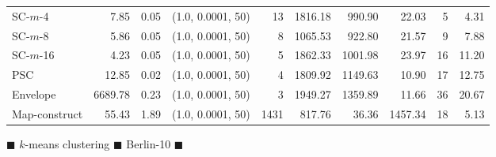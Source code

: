 \begin{figure}
\begin{center}
\begin{minipage}{\textwidth}
{\begin{tabular}{@{}lrrcrrrrrr@{}}
        SC-$m$-4 & 7.85 & 0.05 & (1.0, 0.0001, 50) & 13 & 1816.18 & 990.90 & 22.03 & 5 & 4.31\\
        SC-$m$-8 & 5.86 & 0.05 & (1.0, 0.0001, 50) & 8 & 1065.53 & 922.80 & 21.57 & 9 & 7.88\\
        SC-$m$-16 & 4.23 & 0.05 & (1.0, 0.0001, 50) & 5 & 1862.33 & 1001.98 & 23.97 & 16 & 11.20\\
        PSC & 12.85 & 0.02 & (1.0, 0.0001, 50) & 4 & 1809.92 & 1149.63 & 10.90 & 17 & 12.75\\
        Envelope & 6689.78 & 0.23 & (1.0, 0.0001, 50) & 3 & 1949.27 & 1359.89 & 11.66 & 36 & 20.67\\
        Map-construct & 55.43 & 1.89 & (1.0, 0.0001, 50) & 1431 & 817.76 & 36.36 & 1457.34 & 18 & 5.13\\
        \bottomrule
    \end{tabular}
    }
\end{minipage}
\end{center}
        \caption{$\blacksquare$ $k$-means clustering $\blacksquare$ Berlin-10 $\blacksquare$}
 \end{figure}